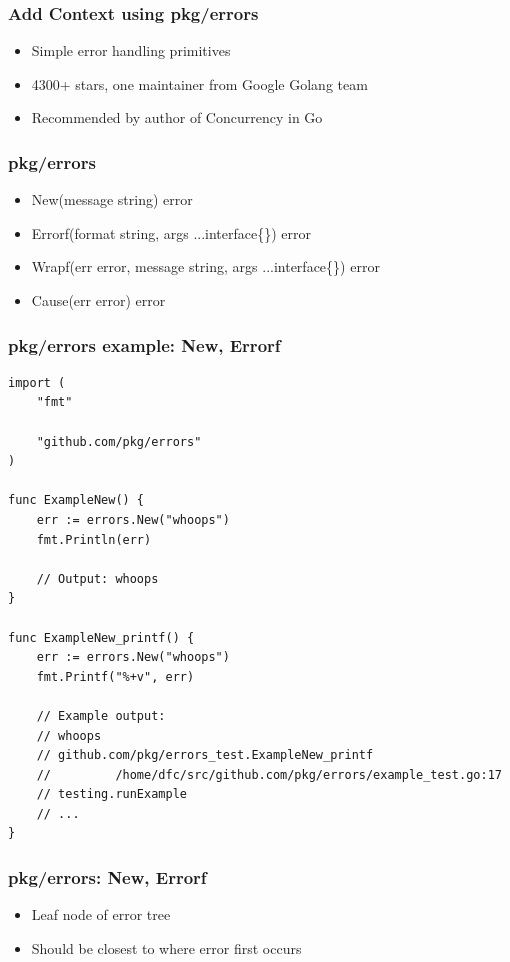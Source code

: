 \documentclass[9pt]{beamer}
\begin{document}
\begin{frame}[fragile]
\frametitle{Add Context using pkg/errors}


\begin{itemize}
\item Simple error handling primitives
\item 4300+ stars, one maintainer from Google Golang team
\item Recommended by author of Concurrency in Go
\end{itemize}


\end{frame}

\begin{frame}[fragile]
\frametitle{pkg/errors}


\begin{itemize}
\item New(message string) error
\item Errorf(format string, args ...interface\{\}) error
\item Wrapf(err error, message string,  args ...interface\{\}) error
\item Cause(err error) error
\end{itemize}


\end{frame}

\begin{frame}[fragile]
\frametitle{pkg/errors example: New, Errorf}


\begin{verbatim}
import (
	"fmt"

	"github.com/pkg/errors"
)

func ExampleNew() {
	err := errors.New("whoops")
	fmt.Println(err)

	// Output: whoops
}

func ExampleNew_printf() {
	err := errors.New("whoops")
	fmt.Printf("%+v", err)

	// Example output:
	// whoops
	// github.com/pkg/errors_test.ExampleNew_printf
	//         /home/dfc/src/github.com/pkg/errors/example_test.go:17
	// testing.runExample
	// ...
}

\end{verbatim}


\end{frame}

\begin{frame}[fragile]
\frametitle{pkg/errors: New, Errorf}


\begin{itemize}
\item Leaf node of error tree
\item Should be closest to where error first occurs
\end{itemize}


\end{frame}
\end{document}
